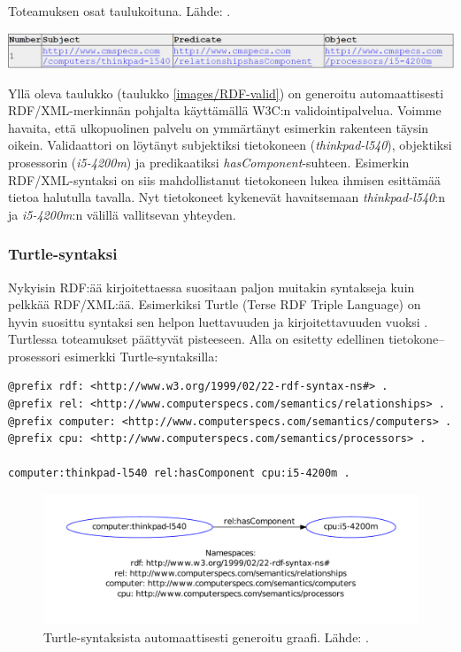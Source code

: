 \documentclass[finnish, 12pt, a4paper, elec, utf8, pdfa, online]{aaltothesis}
\begin{document}
\begin{table}
  \centering
  \caption{Toteamuksen osat taulukoituna. Lähde: \cite{W3C_RDF_validator}. \label{images/RDF-valid}}
  \includegraphics[width=15cm]{images/RDF-valid.PNG}
\end{table}

Yllä oleva taulukko (taulukko \ref{images/RDF-valid}) on generoitu automaattisesti RDF/XML-merkinnän pohjalta käyttämällä W3C:n validointipalvelua. Voimme havaita, että ulkopuolinen palvelu on ymmärtänyt esimerkin rakenteen täysin oikein. Validaattori on löytänyt subjektiksi tietokoneen (\textit{thinkpad-l540}), objektiksi prosessorin (\textit{i5-4200m}) ja predikaatiksi \textit{hasComponent}-suhteen. Esimerkin RDF/XML-syntaksi on siis mahdollistanut tietokoneen lukea ihmisen esittämää tietoa halutulla tavalla. Nyt tietokoneet kykenevät havaitsemaan \textit{thinkpad-l540}:n ja \textit{i5-4200m}:n välillä vallitsevan yhteyden.


\subsubsection{Turtle-syntaksi}
Nykyisin RDF:ää kirjoitettaessa suositaan paljon muitakin syntakseja kuin pelkkää RDF/XML:ää. Esimerkiksi Turtle (Terse RDF Triple Language) on hyvin suosittu syntaksi sen helpon luettavuuden ja kirjoitettavuuden vuoksi \cite{cambridge2}. Turtlessa toteamukset päättyvät pisteeseen. Alla on esitetty edellinen tietokone--prosessori esimerkki Turtle-syntaksilla:

\vskip 0.75cm
\begin{lstlisting}[style=codeblock,caption={Turtle syntaksiesimerkki.},captionpos=b,label={turtle_esim}]
@prefix rdf: <http://www.w3.org/1999/02/22-rdf-syntax-ns#> .
@prefix rel: <http://www.computerspecs.com/semantics/relationships> .
@prefix computer: <http://www.computerspecs.com/semantics/computers> .
@prefix cpu: <http://www.computerspecs.com/semantics/processors> .

computer:thinkpad-l540 rel:hasComponent cpu:i5-4200m .

\end{lstlisting}
\vskip 0.75cm

\begin{figure}[htb]
\centering
\includegraphics[width=15cm]{images/RDF-triplet2.pdf}
\vspace{-3pc}
\caption{Turtle-syntaksista automaattisesti generoitu graafi. Lähde: \cite{SeCo_RDF_validator}. \label{images/RDF-triplet2}}
\end{figure}
\end{document}
